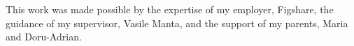 This work was made possible by the expertise of my employer, Figshare, the guidance of my supervisor, Vasile Manta, and the support of my parents, Maria and Doru-Adrian.